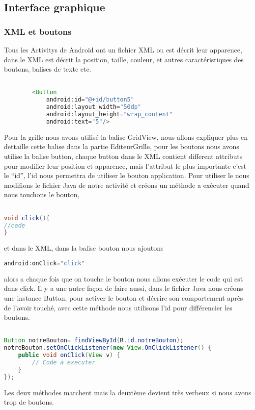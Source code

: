 \documentclass{article}
\begin{document}
\subsection{Interface graphique}
\subsubsection{XML et boutons}
Tous les Activitys de Android ont un fichier XML ou est décrit leur apparence, dans le XML est décrit la position, taille, couleur, et autres caractéristiques des boutons, balises de texte etc.
\begin{lstlisting}[language=Java, caption = Exemple balise XML] 

        <Button
            android:id="@+id/button5"
            android:layout_width="50dp"
            android:layout_height="wrap_content"
            android:text="5"/>


\end{lstlisting}
Pour la grille nous avons utilisé la balise GridView, nous allons expliquer plus en dettaille cette balise dans la partie EditeurGrille, pour les boutons nous avons utilise la balise button, chaque button dans le XML contient different attributs pour modifier leur position et apparence, mais l’attribut le plus importante c’est le “id”, l’id nous permettra de utiliser le bouton application. Pour utiliser le nous modifions le fichier Java de notre activité et créons un méthode a exécuter quand nous touchons le bouton, 

\begin{lstlisting}[language=Java, caption = Méthode du bouton] 

void click(){
//code
}

\end{lstlisting}

et dans le XML, dans la balise bouton nous ajoutons 

\begin{lstlisting}[language=Java] 
android:onClick="click"

\end{lstlisting}

alors a chaque fois que on touche le bouton nous allons exécuter le code qui est dans click.
Il y a une autre façon de faire aussi, dans le fichier Java nous créons une instance Button, 
pour activer le bouton et décrire son comportement après de l’avoir touché, avec cette méthode nous utilisons l'id pour différencier les boutons.
\begin{lstlisting}[language=Java, caption=Initialisation d'un bouton] 

Button notreBouton= findViewById(R.id.notreBouton);  
notreBouton.setOnClickListener(new View.OnClickListener() {
    public void onClick(View v) {
        // Code a executer
    } 
});

\end{lstlisting}
Les deux méthodes marchent mais la deuxième devient très verbeux si nous avons trop de boutons.
\end{document}
